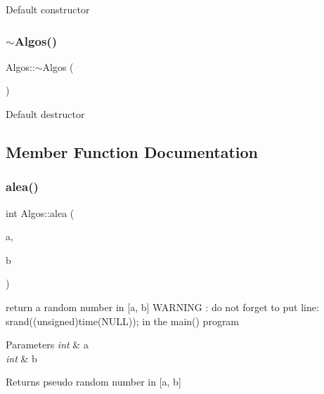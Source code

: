 Default constructor \mbox{\label{class_algos_a42e3acfd80bd78b2a5a9d08188296f02}} 
\subsubsection{\texorpdfstring{$\sim$Algos()}{~Algos()}}
{\footnotesize\ttfamily Algos\+::$\sim$\+Algos (\begin{DoxyParamCaption}{ }\end{DoxyParamCaption})\hspace{0.3cm}{\ttfamily [virtual]}}

Default destructor 

\subsection{Member Function Documentation}
\mbox{\label{class_algos_aeea47d178f5840b4586dc7f7d6166c17}} 
\subsubsection{\texorpdfstring{alea()}{alea()}}
{\footnotesize\ttfamily int Algos\+::alea (\begin{DoxyParamCaption}\item[{const int}]{a,  }\item[{const int}]{b }\end{DoxyParamCaption})\hspace{0.3cm}{\ttfamily [static]}}

return a random number in \mbox{[}a, b\mbox{]} W\+A\+R\+N\+I\+NG \+: do not forget to put line\+: srand((unsigned)time(\+N\+U\+L\+L)); in the main() program


\begin{DoxyParams}{Parameters}
{\em int} & a \\
\hline
{\em int} & b \\
\hline
\end{DoxyParams}
\begin{DoxyReturn}{Returns}
pseudo random number in \mbox{[}a, b\mbox{]} 
\end{DoxyReturn}
\mbox{\label{class_algos_a598ade8625d3bde87533c6355c521082}} 
